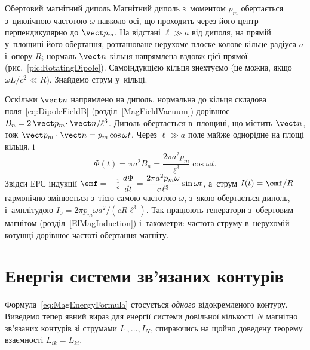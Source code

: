 \begin{Example}{Обертовий магнітний диполь}
	Магнітний диполь з~моментом $p_m$ обертається з~циклічною частотою $\omega$ навколо осі, що проходить через його центр
	перпендикулярно до $\vect p_m$. На відстані $\ell\gg a$ від диполя, на прямій у~площині його обертання, розташоване нерухоме
	плоске колове кільце радіуса $a$ і~опору $R$; нормаль $\vect n$ кільця напрямлена вздовж цієї прямої
	(рис.~\ref{pic:RotatingDipole}). Самоіндукцією кільця знехтуємо (це можна, якщо $\omega L/c^2\ll R$). Знайдемо струм
	у~кільці.

	Оскільки $\vect n$ напрямлено на диполь, нормальна до кільця складова поля~\eqref{eq:DipoleFieldB}
	(розділ~\ref{MagFieldVacuum}) дорівнює $B_n=2\,\vect p_m\!\cdot\vect n/\ell^3$. Диполь обертається в~площині, що містить
	$\vect n$, тож $\vect p_m\cdot\vect n=p_m\cos\omega t$. Через $\ell\gg a$ поле майже однорідне на площі кільця, і
	\begin{equation*}
		\Phi(t)=\pi a^2B_n=\frac{2\pi a^2p_m}{\ell^3}\cos\omega t.
	\end{equation*}
	Звідси ЕРС індукції $\emf=-\frac1c\,\dfrac{d\Phi}{dt}=\dfrac{2\pi a^2p_m\omega}{c\,\ell^3}\sin\omega t$, а~струм
	$I(t)=\emf/R$ гармонічно змінюється з~тією самою частотою $\omega$, з~якою обертається диполь, і~амплітудою
	$I_0=2\pi p_m\omega a^2/(cR\ell^3)$. Так працюють генератори з~обертовим магнітом (розділ~\ref{ElMagInduction}) і~тахометри:
	частота струму в~нерухомій котушці дорівнює частоті обертання магніту.
\end{Example}



\section{Енергія системи зв'язаних контурів}\hypertarget{coupled-circuits-energy}{}

Формула~\eqref{eq:MagEnergyFormula} стосується \emph{одного} відокремленого контуру.
Виведемо тепер явний вираз для енергії системи довільної кількості $N$ магнітно зв'язаних
контурів зі струмами $I_1,\dots,I_N$, спираючись на щойно доведену теорему взаємності
$L_{ik}=L_{ki}$.

